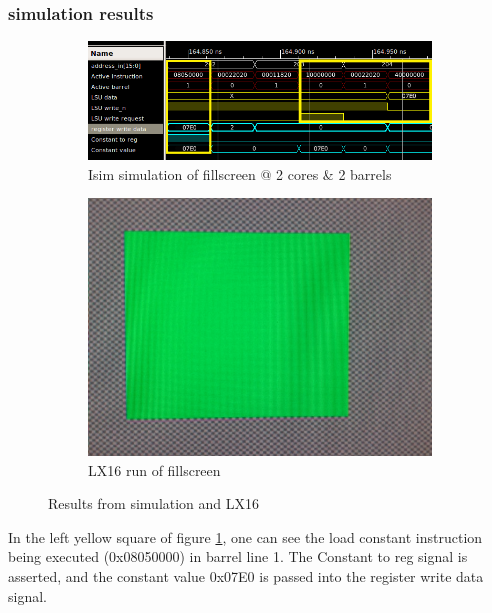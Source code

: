 \documentclass[../main/report.tex]{subfiles}
\begin{document}
\subsubsection*{simulation results}

\begin{figure}[H]
  \centering
  \begin{subfigure}[b]{\textwidth}
    \includegraphics[width=\textwidth]{assets/Constant_load_&_store.png}
    \caption{Isim simulation of fillscreen @ 2 cores \& 2 barrels}
    \label{fig:isim-kernel-parameterization}
  \end{subfigure}
  \begin{subfigure}[b]{0.3\textwidth}
    \includegraphics[width=\textwidth]{assets/green_screen.jpg}
    \caption{LX16 run of fillscreen}
    \label{fig:LX16-kernel-parameterization}
  \end{subfigure}
  \caption{Results from simulation and LX16}
\end{figure}

In the left yellow square of figure \ref{fig:isim-kernel-parameterization}, one can see the load constant instruction being executed (0x08050000) in barrel line 1.
The Constant to reg signal is asserted, and the constant value 0x07E0 is passed into the register write data signal.
\end{document}
